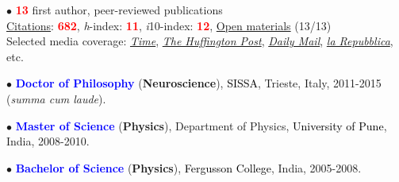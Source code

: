 \documentclass[10pt]{article}
\begin{document}
	
	

	
	$\bullet$ \textbf{\textcolor{red}{13}} first author, peer-reviewed publications\\
	\hspace*{0.1in}\href{https://scholar.google.it/citations?user=kSYuYTUAAAAJ&hl=en&oi=ao}{Citations}: \textbf{\textcolor{red}{682}}, \textit{h}-index: \textbf{\textcolor{red}{11}}, \textit{i}10-index: \textbf{\textcolor{red}{12}}, \href{https://osf.io/hk5f3/}{Open materials} (13/13)\\
	\hspace*{0.1in}Selected media coverage: \href{http://time.com/3242/driving-over-your-best-friend-its-the-right-thing-to-do/}{\textit{Time}}, \href{http://www.huffingtonpost.com/entry/autism-empathy-brain-research_us_56f92575e4b014d3fe237413}{\textit{The Huffington Post}}, \href{http://www.dailymail.co.uk/sciencetech/article-4308284/Virtual-reality-experiment-puts-altruism-test.html}{\textit{Daily Mail}}, \href{http://www.repubblica.it/scienze/2017/04/11/news/area_cervello_perdono-162669836/?rss}{\textit{la Repubblica}}, etc.

	
	$\bullet$ \textbf{\textcolor{blue}{Doctor of Philosophy}} (\textbf{Neuroscience}), \textcolor{black}{SISSA}, Trieste, Italy, 2011-2015 (\textit{summa cum laude}).\\ 
	 \miniskip
	
	$\bullet$ \textbf{\textcolor{blue}{Master of Science}} (\textbf{Physics}), Department of Physics, \textcolor{black}{University of Pune}, India, 2008-2010.\\%
	\miniskip
	
	$\bullet$ \textbf{\textcolor{blue}{Bachelor of Science}} (\textbf{Physics}), \textcolor{black}{Fergusson College}, India, 2005-2008.%
\end{document}
